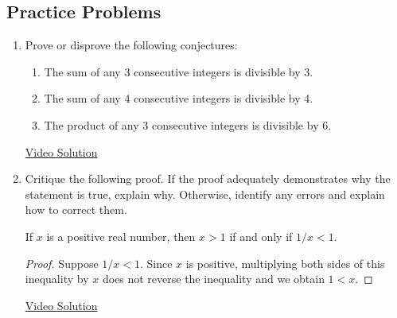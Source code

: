 \begin{enumerate}
  
  
\end{enumerate}

\subsection*{Practice Problems}

\begin{enumerate}\renewcommand{\labelenumi}{\thesubsection.\theenumi} 
  \item Prove or disprove the following conjectures:\prelistskip
	\begin{enumerate}
	  \item The sum of any 3 consecutive integers is divisible by 3.
	  \item The sum of any 4 consecutive integers is divisible by 4.
	  \item The product of any 3 consecutive integers is divisible by 6.
	\end{enumerate}
	
	  
  \href{https://youtu.be/R5zpsZoR16w}{Video Solution}
	
    \item Critique the following proof.
    If the proof adequately demonstrates why the statement is true, explain why.
    Otherwise, identify any errors and explain how to correct them.
    \begin{thm}
        If $x$ is a positive real number, then $x > 1$ if and only if $1/x < 1$.
    \end{thm}
    \begin{proof}
        Suppose $1/x < 1$.
        Since $x$ is positive, multiplying both sides of this inequality by $x$ does not reverse the inequality and we obtain $1 < x$.
    \end{proof}
	
	\href{https://youtu.be/R_W3wwJRlmQ}{Video Solution}
	
\end{enumerate}

